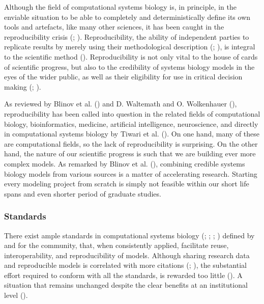 \documentclass[
  a4paper,
]{scrartcl}
\begin{document}
Although the field of computational systems biology is, in principle, in
the enviable situation to be able to completely and deterministically
define its own tools and artefacts, like many other sciences, it has
been caught in the reproducibility crisis
(;
).
Reproducibility, the ability of independent parties to replicate results
by merely using their methodological description
(;
), is integral to
the scientific method ().
Reproducibility is not only vital to the house of cards of scientific
progress, but also to the credibility of systems biology models in the
eyes of the wider public, as well as their eligibility for use in
critical decision making (; ).

As reviewed by Blinov et al.
() and D. Waltemath and O.
Wolkenhauer (), reproducibility
has been called into question in the related fields of computational
biology, bioinformatics, medicine, artificial intelligence,
neuroscience, and directly in computational systems biology by Tiwari et
al. (). On one hand,
many of these are computational fields, so the lack of reproducibility
is surprising. On the other hand, the nature of our scientific progress
is such that we are building ever more complex models. As remarked by
Blinov et al. (), combining
credible systems biology models from various sources is a matter of
accelerating research. Starting every modeling project from scratch is
simply not feasible within our short life spans and even shorter period
of graduate studies.

\subsubsection{Standards}\label{standards}

There exist ample standards in computational systems biology
(;
;
;
) defined by and for the community, that, when consistently
applied, facilitate reuse, interoperability, and reproducibility of
models. Although sharing research data and reproducible models is
correlated with more citations
(;
),
the substantial effort required to conform with all the standards, is
rewarded too little (). A situation that remains unchanged despite the
clear benefits at an institutional level
().
\end{document}
